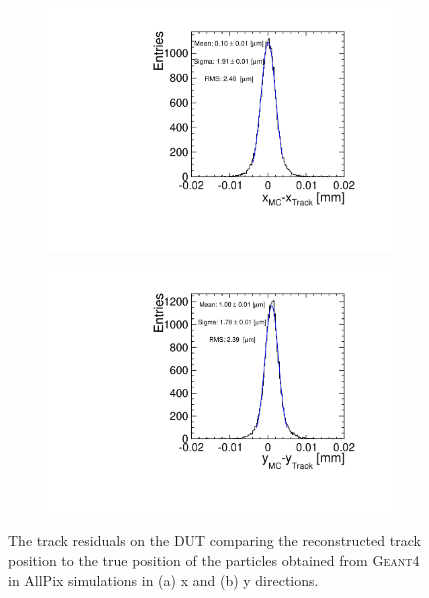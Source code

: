\begin{figure}[htbp] \centering
  \begin{subfigure}[b]{0.45\textwidth}
    \includegraphics[width=\textwidth]{figures/Telescope/Unbiased_trackRes_DUT_x.pdf}
    \caption{}
  \end{subfigure}\hfill
  \begin{subfigure}[b]{0.45\textwidth}
    \includegraphics[width=\textwidth]{figures/Telescope/Unbiased_trackRes_DUT_y.pdf}
    \caption{}
  \end{subfigure}
  \caption{The track residuals on the DUT comparing the reconstructed
    track position to the true position of the particles obtained from
    \textsc{Geant4} in AllPix simulations in (a) x and (b) y
    directions.}
  \label{fig:DUT_MC_track}
\end{figure}


